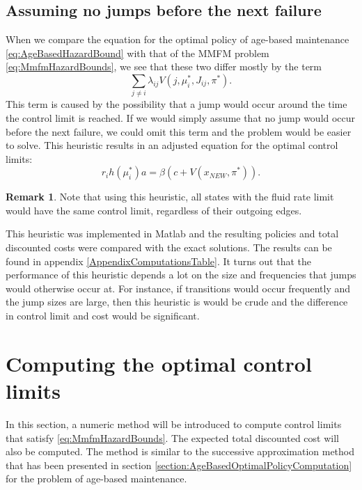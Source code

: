 \documentclass[a4paper]{thesis}
\theoremstyle{definition}
\newtheorem{remark}{Remark}[chapter]
\begin{document}
\subsection{Assuming no jumps before the next failure}
When we compare the equation for the optimal policy of age-based maintenance \eqref{eq:AgeBasedHazardBound} with that of the MMFM problem \eqref{eq:MmfmHazardBounds},
we see that these two differ mostly by the term 
\[
\sum\limits_{j\neq i}\lambda_{ij}V(j,\mu_i^*,J_{ij},\pi^*).
\]
This term is caused by the possibility that a jump would occur around the time the control limit is reached.
If we would simply assume that no jump would occur before the next failure, we could omit this term and the problem would be easier to solve.
This heuristic results in an adjusted equation for the optimal control limits:
\[
r_ih(\mu_i^*)a=\beta(c+V(x_{NEW},\pi^*)).
\]
\begin{remark}
	Note that using this heuristic, all states with the fluid rate limit would have the same control limit, regardless of their outgoing edges.
\end{remark}
This heuristic was implemented in Matlab and the resulting policies and total discounted costs were compared with the exact solutions.
The results can be found in appendix \ref{AppendixComputationsTable}.
It turns out that the performance of this heuristic depends a lot on the size and frequencies that jumps would otherwise occur at.
For instance, if transitions would occur frequently and the jump sizes are large, then this heuristic is would be crude and the difference in control limit and cost would be significant. \section{Computing the optimal control limits}
In this section, a numeric method will be introduced to compute control limits that satisfy \eqref{eq:MmfmHazardBounds}.
The expected total discounted cost will also be computed.
The method is similar to the successive approximation method that has been presented in section \ref{section:AgeBasedOptimalPolicyComputation} for the problem of age-based maintenance.
\end{document}
